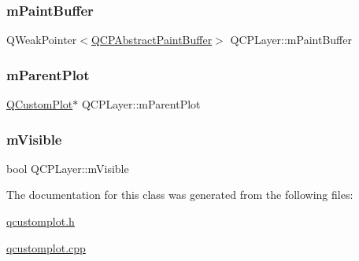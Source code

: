 \subsubsection{\texorpdfstring{m\+Paint\+Buffer}{mPaintBuffer}}
{\footnotesize\ttfamily Q\+Weak\+Pointer$<$\hyperlink{class_q_c_p_abstract_paint_buffer}{Q\+C\+P\+Abstract\+Paint\+Buffer}$>$ Q\+C\+P\+Layer\+::m\+Paint\+Buffer\hspace{0.3cm}{\ttfamily [protected]}}

\mbox{\label{class_q_c_p_layer_a2f3374a7884bf403720cd1cf6f7ad1bb}} 
\subsubsection{\texorpdfstring{m\+Parent\+Plot}{mParentPlot}}
{\footnotesize\ttfamily \hyperlink{class_q_custom_plot}{Q\+Custom\+Plot}$\ast$ Q\+C\+P\+Layer\+::m\+Parent\+Plot\hspace{0.3cm}{\ttfamily [protected]}}

\mbox{\label{class_q_c_p_layer_a264950deb08e589460c126c895a1e2b5}} 
\subsubsection{\texorpdfstring{m\+Visible}{mVisible}}
{\footnotesize\ttfamily bool Q\+C\+P\+Layer\+::m\+Visible\hspace{0.3cm}{\ttfamily [protected]}}



The documentation for this class was generated from the following files\+:\begin{DoxyCompactItemize}
\item 
\hyperlink{qcustomplot_8h}{qcustomplot.\+h}\item 
\hyperlink{qcustomplot_8cpp}{qcustomplot.\+cpp}\end{DoxyCompactItemize}
